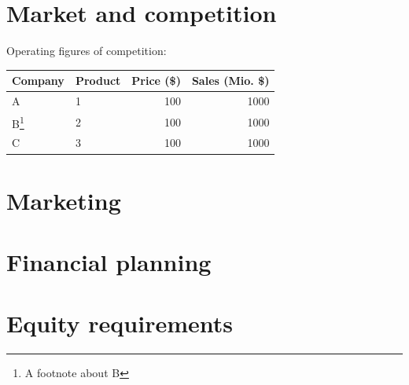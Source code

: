 \documentclass[a4paper,11pt]{article}
\begin{document}
\section{Market and competition}
Operating figures of competition:
\begin{center}
\begin{tabular}{l|l|r|r}
Company & Product & Price (\$) & \pbox{20cm}{Sales\\(Mio. \$)}\\
\hline
A & 1 & 100 & 1000\\
B\footnote{A footnote about B} & 2 & 100 & 1000\\
C & 3 & 100 & 1000\\
\end{tabular}
\end{center}

\section{Marketing}

\section{Financial planning}

\section{Equity requirements}
\end{document}
